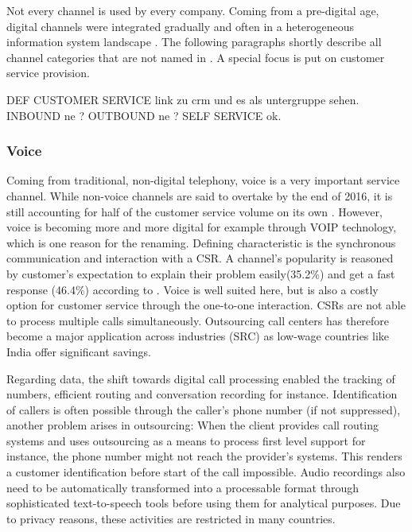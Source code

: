 		Not every channel is used by every company. Coming from a pre-digital age, digital channels were integrated gradually and often in a heterogeneous information system landscape \citep{Chen_2003}. The following paragraphs shortly describe all channel categories that are not named  in  \citeauthor{paynefrow2005}. A special focus is put on customer service provision. 
		
		DEF CUSTOMER SERVICE link zu crm und es als untergruppe sehen. 
		INBOUND ne ?
		OUTBOUND ne ?
		SELF SERVICE ok.
		
		
		\subsubsection{Voice}
		
		Coming from traditional, non-digital telephony, voice is a very important service channel. While non-voice channels are said to overtake by the end of 2016, it is still accounting for half of the customer service volume on its own \citep{dimensiondata2016}. However, voice is becoming more and more digital for example through \acrfull{VOIP} technology, which is one reason for the renaming. Defining characteristic is the synchronous communication and interaction with a \acrfull{CSR}. A channel's popularity is reasoned by customer's expectation to explain their problem easily(35.2\%) and get a fast response (46.4\%) according to \citep{ocm2015}. Voice is well suited here, but is also a costly option for customer service through the one-to-one interaction. \acrshort{CSR}s are not able to process multiple calls simultaneously. Outsourcing call centers has therefore become a major application across industries (SRC) as low-wage countries like India offer significant savings. 
		
		Regarding data, the shift towards digital call processing enabled the tracking of numbers, efficient routing and conversation recording for instance. Identification of callers is often possible through the caller's phone number (if not suppressed), another problem arises in outsourcing: When the client provides call routing systems and uses outsourcing as a means to process first level support for instance, the phone number might not reach the provider's systems. This renders a customer identification before start of the call impossible. Audio recordings also need to be automatically transformed into a processable format through sophisticated text-to-speech tools before using them for analytical purposes. Due to privacy reasons, these activities are restricted in many countries. 
		
